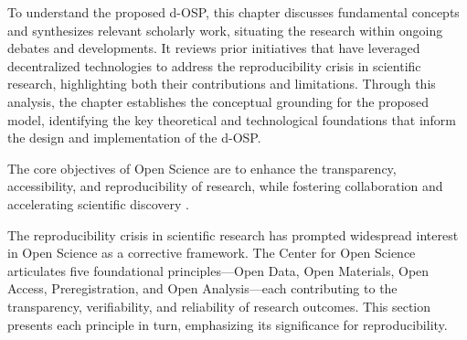 \documentclass[final]{rc-book-2.14}
\begin{document}
To understand the proposed d-OSP, this chapter discusses fundamental concepts and synthesizes relevant scholarly work, situating the research within ongoing debates and developments. It reviews prior initiatives that have leveraged decentralized technologies to address the reproducibility crisis in scientific research, highlighting both their contributions and limitations. Through this analysis, the chapter establishes the conceptual grounding for the proposed model, identifying the key theoretical and technological foundations that inform the design and implementation of the d-OSP.

The core objectives of Open Science are to enhance the transparency, accessibility, and reproducibility of research, while fostering collaboration and accelerating scientific discovery \cite{Leonelli2016}.

The reproducibility crisis in scientific research has prompted widespread interest in Open Science as a corrective framework. The Center for Open Science articulates five foundational principles—Open Data, Open Materials, Open Access, Preregistration, and Open Analysis—each contributing to the transparency, verifiability, and reliability of research outcomes. This section presents each principle in turn, emphasizing its significance for reproducibility.
\end{document}
